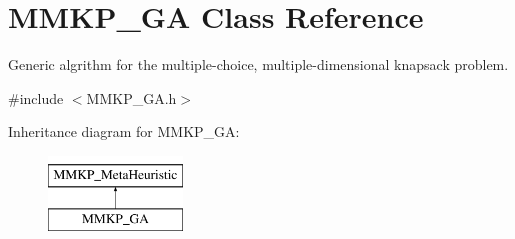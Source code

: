 \hypertarget{class_m_m_k_p___g_a}{\section{M\+M\+K\+P\+\_\+\+G\+A Class Reference}
\label{class_m_m_k_p___g_a}
}


Generic algrithm for the multiple-\/choice, multiple-\/dimensional knapsack problem.  




{\ttfamily \#include $<$M\+M\+K\+P\+\_\+\+G\+A.\+h$>$}

Inheritance diagram for M\+M\+K\+P\+\_\+\+G\+A\+:\begin{figure}[H]
\begin{center}
\leavevmode
\includegraphics[height=2.000000cm]{class_m_m_k_p___g_a}
\end{center}
\end{figure}
